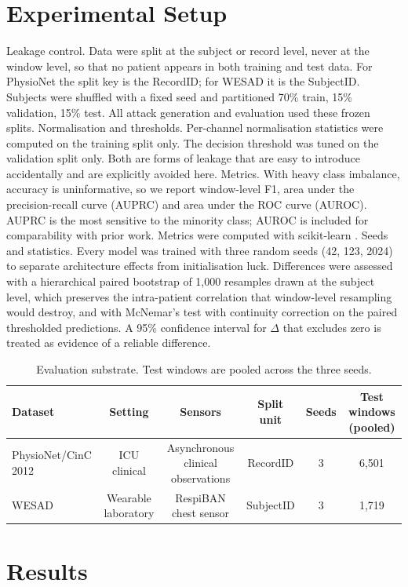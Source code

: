 \documentclass[conference]{IEEEtran}
\begin{document}
\section{Experimental Setup}
Leakage control. Data were split at the subject or record level, never at the window level, so that no patient appears in both training and test data. For PhysioNet the split key is the RecordID; for WESAD it is the SubjectID. Subjects were shuffled with a fixed seed and partitioned 70\% train, 15\% validation, 15\% test. All attack generation and evaluation used these frozen splits.
Normalisation and thresholds. Per-channel normalisation statistics were computed on the training split only. The decision threshold was tuned on the validation split only. Both are forms of leakage that are easy to introduce accidentally and are explicitly avoided here.
Metrics. With heavy class imbalance, accuracy is uninformative, so we report window-level F1, area under the precision-recall curve (AUPRC) and area under the ROC curve (AUROC). AUPRC is the most sensitive to the minority class; AUROC is included for comparability with prior work. Metrics were computed with scikit-learn \cite{pedregosa2011}.
Seeds and statistics. Every model was trained with three random seeds (42, 123, 2024) to separate architecture effects from initialisation luck. Differences were assessed with a hierarchical paired bootstrap of 1,000 resamples drawn at the subject level, which preserves the intra-patient correlation that window-level resampling would destroy, and with McNemar's test with continuity correction on the paired thresholded predictions. A 95\% confidence interval for $\Delta$ that excludes zero is treated as evidence of a reliable difference.
\begin{table}[t]
\caption{Evaluation substrate. Test windows are pooled across the three seeds.}
\label{tab:8}
\centering
\small
\begin{tabular}{lccccc}
\toprule
Dataset & Setting & Sensors & Split unit & Seeds & Test windows (pooled) \\
\midrule
PhysioNet/CinC 2012 & ICU clinical & Asynchronous clinical observations & RecordID & 3 & 6,501 \\
WESAD & Wearable laboratory & RespiBAN chest sensor & SubjectID & 3 & 1,719 \\
\bottomrule
\end{tabular}
\end{table}
\section{Results}
\end{document}
